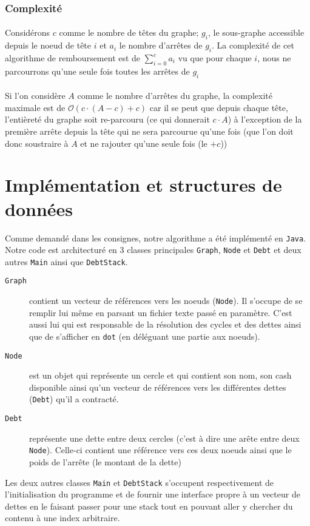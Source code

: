 \documentclass[12pt, oneside]{article}
\begin{document}
\subsubsection{Complexité}
\paragraph{}
Considérons $c$ comme le nombre de têtes du graphe; $g_{i}$, le sous-graphe accessible depuis le noeud de tête $i$ et $a_{i}$ le nombre d'arrêtes de $g_{i}$.
La complexité de cet algorithme de remboursement est de $\sum_{i=0}^{c}a_{i}$ vu que pour chaque $i$, nous ne parcourrons qu'une seule fois toutes les arrêtes de $g_{i}$
\paragraph{}
Si l'on considère $A$ comme le nombre d'arrêtes du graphe, la complexité maximale est de $ \mathcal{O}(c\cdot(A-c)+c)$ car il se peut que depuis chaque tête, l'entièreté du graphe soit re-parcouru (ce qui donnerait $c\cdot A$) à l'exception de la première arrête depuis la tête qui ne sera parcourue qu'une fois (que l'on doit donc soustraire à $A$ et ne rajouter qu'une seule fois (le $+c$))
\section{Implémentation et structures de données}
Comme demandé dans les consignes, notre algorithme a été implémenté en \texttt{Java}. Notre code est architecturé en 3 classes principales \texttt{Graph}, \texttt{Node} et \texttt{Debt} et deux autres \texttt{Main} ainsi que \texttt{DebtStack}.
\begin{description}
\item[\texttt{Graph}] contient un vecteur de références vers les noeuds (\texttt{Node}). Il s'occupe de se remplir lui même en parsant un fichier texte passé en paramètre. C'est aussi lui qui est responsable de la résolution des cycles et des dettes ainsi que de s'afficher en \texttt{dot} (en déléguant une partie aux noeuds).
\item[\texttt{Node}] est un objet qui représente un cercle et qui contient son nom, son cash disponible ainsi qu'un vecteur de références vers les différentes dettes
(\texttt{Debt}) qu'il a contracté.
\item[\texttt{Debt}] représente une dette entre deux cercles (c'est à dire une arête entre deux \texttt{Node}). Celle-ci contient une référence vers ces deux noeuds ainsi que le poids de l'arrête (le montant de la dette)
\end{description}
Les deux autres classes \texttt{Main} et \texttt{DebtStack} s'occupent respectivement de l'initialisation du programme et de fournir une interface propre à un vecteur de dettes en le faisant passer pour une stack tout en pouvant aller y chercher du contenu à une index arbitraire.
\end{document}
